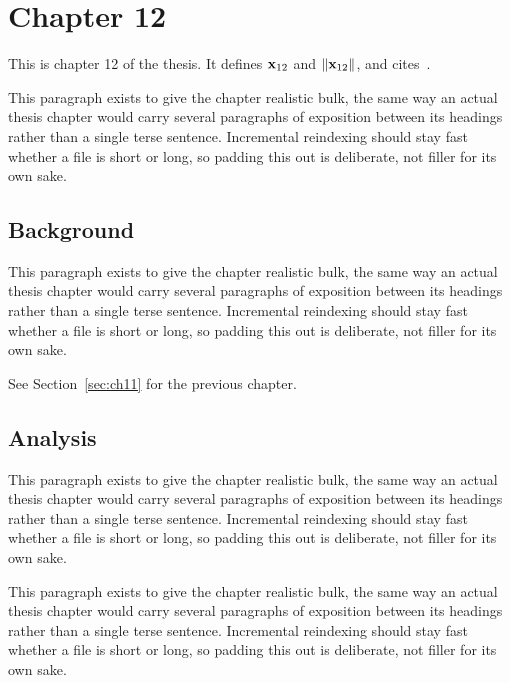 \section{Chapter 12}
\label{sec:ch12}

This is chapter 12 of the thesis. It defines $\mathbf{x}_{12}$ and $\lVert \mathbf{x}_{12} \rVert$, and cites~\cite{ref1}.

This paragraph exists to give the chapter realistic bulk, the same way an actual thesis chapter would carry several paragraphs of exposition between its headings rather than a single terse sentence. Incremental reindexing should stay fast whether a file is short or long, so padding this out is deliberate, not filler for its own sake.

\subsection{Background}
\label{sec:ch12:background}

This paragraph exists to give the chapter realistic bulk, the same way an actual thesis chapter would carry several paragraphs of exposition between its headings rather than a single terse sentence. Incremental reindexing should stay fast whether a file is short or long, so padding this out is deliberate, not filler for its own sake.

See Section~\ref{sec:ch11} for the previous chapter.

\subsection{Analysis}
\label{sec:ch12:analysis}

This paragraph exists to give the chapter realistic bulk, the same way an actual thesis chapter would carry several paragraphs of exposition between its headings rather than a single terse sentence. Incremental reindexing should stay fast whether a file is short or long, so padding this out is deliberate, not filler for its own sake.

This paragraph exists to give the chapter realistic bulk, the same way an actual thesis chapter would carry several paragraphs of exposition between its headings rather than a single terse sentence. Incremental reindexing should stay fast whether a file is short or long, so padding this out is deliberate, not filler for its own sake.
